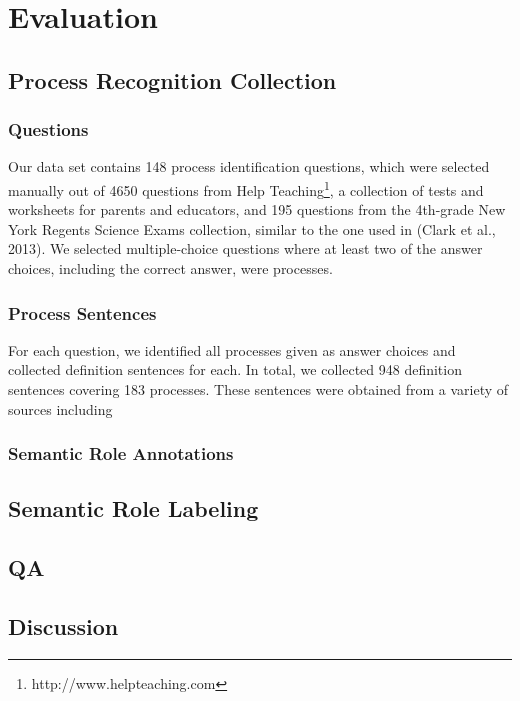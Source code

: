 \section{Evaluation}

\subsection{Process Recognition Collection}

\subsubsection{Questions}

Our data set contains 148 process identification questions, which were selected manually out of 4650 questions from Help Teaching\footnote{http://www.helpteaching.com}, a collection of tests and worksheets for parents and educators, and 195 questions from the 4th-grade New York Regents Science Exams collection, similar to the one used in (Clark et al., 2013). We selected multiple-choice questions where at least two of the answer choices, including the correct answer, were processes.

\subsubsection{Process Sentences}


For each question, we identified all processes given as answer choices and collected definition sentences for each. In total, we collected 948 definition sentences covering 183 processes. These sentences were obtained from a variety of sources including 


\subsubsection{Semantic Role Annotations}



\subsection{Semantic Role Labeling}



\subsection{QA}


\subsection{Discussion}
